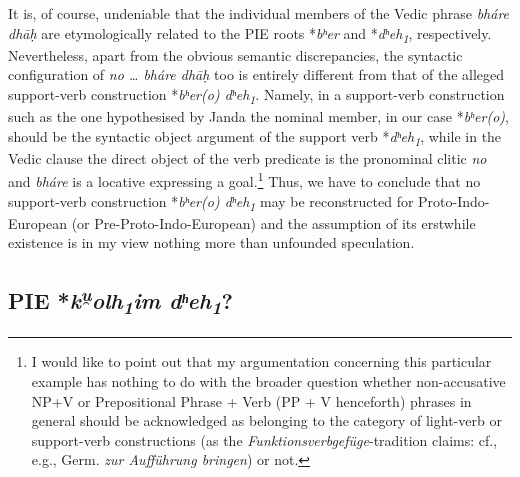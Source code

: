 \documentclass[output=paper,colorlinks,citecolor=brown]{langscibook}
\begin{document}
It is, of course, undeniable that the individual members of the Vedic phrase \textit{bháre dhāḥ} are etymologically related to the PIE roots *\textit{bʰer} and *\textit{dʰeh\textsubscript{1}}, respectively. Nevertheless, apart from the obvious semantic discrepancies, the syntactic configuration of \textit{no … bháre dhāḥ} too is entirely different from that of the alleged support-verb construction *\textit{bʰer(o) dʰeh\textsubscript{1}}. Namely, in a support-verb construction such as the one hypothesised by Janda the nominal member, in our case *\textit{bʰer(o)}, should be the syntactic object argument of the support verb *\textit{dʰeh\textsubscript{1}}, while in the Vedic clause the direct object of the verb predicate is the pronominal clitic \textit{no} and \textit{bháre} is a locative expressing a goal.\footnote{I would like to point out that my argumentation concerning this particular example has nothing to do with the broader question whether non-accusative NP+V or Prepositional Phrase + Verb (PP + V henceforth) phrases in general should be acknowledged as belonging to the category of light-verb or support-verb constructions (as the \textit{Funktionsverbgefüge}-tradition claims: cf., e.g., Germ. \textit{zur Aufführung bringen}) or not.}      Thus, we have to conclude that no support-verb construction *\textit{bʰer(o) dʰeh\textsubscript{1}} may be reconstructed for Proto-Indo-European (or Pre-Proto-Indo-European) and the assumption of its erstwhile existence is in my view nothing more than unfounded speculation.

\subsection{PIE *\textit{k\textsuperscript{u̯}olh\textsubscript{1}im dʰeh\textsubscript{1}}?}
\end{document}
